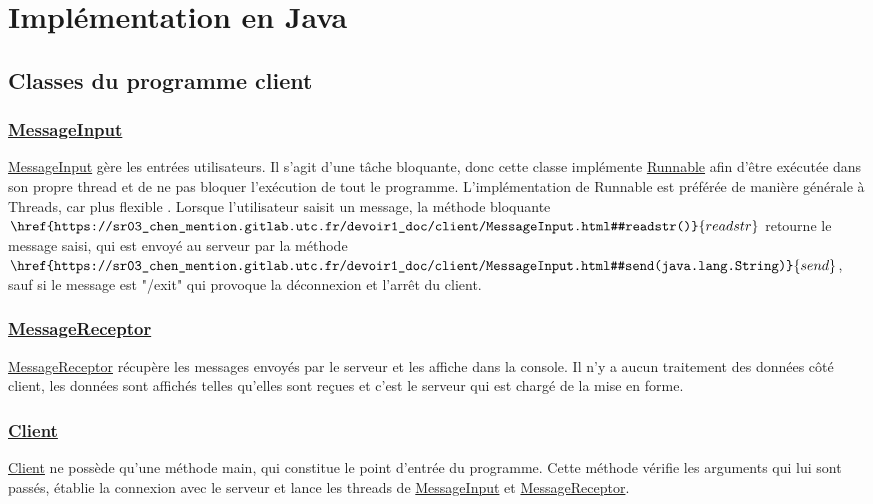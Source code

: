 \documentclass[10pt,a4paper]{article}
\begin{document}
	
	\section{Implémentation en Java}
	
	\subsection{Classes du programme client}
	
	\subsubsection{\href{https://sr03_chen_mention.gitlab.utc.fr/devoir1_doc/client/MessageInput.html}{MessageInput}}
	
	 \href{https://sr03_chen_mention.gitlab.utc.fr/devoir1_doc/client/MessageInput.html}{MessageInput} gère les entrées utilisateurs. Il s'agit d'une tâche bloquante, donc cette classe implémente \href{https://docs.oracle.com/javase/7/docs/api/java/lang/Runnable.html}{Runnable} afin d'être exécutée dans son propre thread et de ne pas bloquer l'exécution de tout le programme. L'implémentation de Runnable est préférée de manière générale à Threads, car plus flexible \cite{runnable:threads}. Lorsque l'utilisateur saisit un message, la méthode bloquante $\href{https://sr03_chen_mention.gitlab.utc.fr/devoir1_doc/client/MessageInput.html#readstr()}{readstr}$ retourne le message saisi, qui est envoyé au serveur par la méthode $\href{https://sr03_chen_mention.gitlab.utc.fr/devoir1_doc/client/MessageInput.html#send(java.lang.String)}{send}$, sauf si le message est "/exit" qui provoque la déconnexion et l'arrêt du client.
	
	\subsubsection{\href{https://sr03_chen_mention.gitlab.utc.fr/devoir1_doc/client/MessageReceptor.html}{MessageReceptor}} 
	\href{https://sr03_chen_mention.gitlab.utc.fr/devoir1_doc/client/MessageReceptor.html}{MessageReceptor} récupère les messages envoyés par le serveur et les affiche dans la console. Il n'y a aucun traitement des données côté client, les données sont affichés telles qu'elles sont reçues et c'est le serveur qui est chargé de la mise en forme.
	
	
	\subsubsection{\href{https://sr03_chen_mention.gitlab.utc.fr/devoir1_doc/client/Client.html}{Client}}
	\href{https://sr03_chen_mention.gitlab.utc.fr/devoir1_doc/client/Client.html}{Client} ne possède qu'une méthode main, qui constitue le point d'entrée du programme. Cette méthode vérifie les arguments qui lui sont passés, établie la connexion avec le serveur et lance les threads de \href{https://sr03_chen_mention.gitlab.utc.fr/devoir1_doc/client/MessageInput.html}{MessageInput} et \href{https://sr03_chen_mention.gitlab.utc.fr/devoir1_doc/client/MessageReceptor.html}{MessageReceptor}.
	
\end{document}
